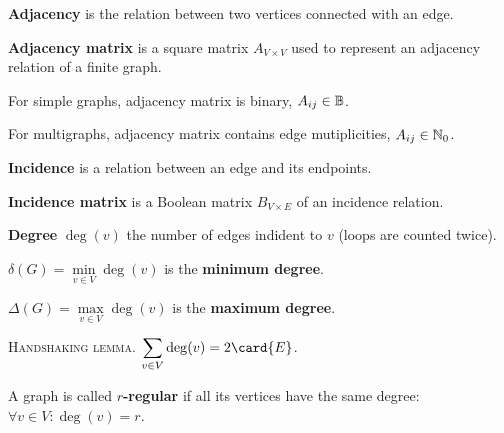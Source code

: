 \documentclass[a4paper,10pt]{article}
\newcommand{\op}[1]{\operatorname*{#1}}
\newcommand{\degree}[1]{\op{deg}(#1)}
\newcommand{\minDegree}[1]{\delta(#1)}
\newcommand{\maxDegree}[1]{\Delta(#1)}
\begin{document}
\begin{terms}
\begin{minipage}{\linewidth}
    \item \textbf{Adjacency} is the relation between two vertices connected with an edge.
    \item \textbf{Adjacency matrix} is a square matrix $A_{V \times V}$ used to represent an adjacency relation of a finite graph.
    \begin{terms}
        \item For simple graphs, adjacency matrix is binary, \ie $A_{ij} \in \mathbb{B}$.
        \item For multigraphs, adjacency matrix contains edge mutiplicities, \ie $A_{ij} \in \mathbb{N}_{0}$.
    \end{terms}

    \item \textbf{Incidence} is a relation between an edge and its endpoints.
    \item \textbf{Incidence matrix} is a Boolean matrix $B_{V \times E}$ of an incidence relation.

    \end{minipage}

    \item \textbf{Degree} $\degree{v}$ the number of edges indident to $v$ (loops are counted twice).

    \begin{terms}
        \item $\minDegree{G} = \min\limits_{v \in V} \degree{v}$ is the \textbf{minimum degree}.
        \item $\maxDegree{G} = \max\limits_{v \in V} \degree{v}$ is the \textbf{maximum degree}.
        \item \textsc{Handshaking lemma}. $\displaystyle \sum_{v \in V} \degree{v} = 2 \card{E}$.
    \end{terms}

    \item A graph is called \textbf{$r$-regular} if all its vertices have the same degree: $\forall v \in V : \degree{v} = r$.

    \begin{minipage}{\linewidth}


\end{minipage}
\end{terms}
\end{document}
